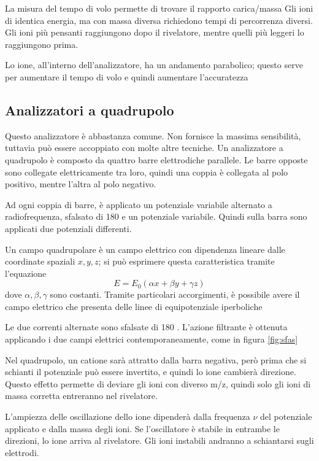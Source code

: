 La misura del tempo di volo permette di trovare il rapporto carica/massa
Gli ioni di identica energia, ma con massa diversa richiedono tempi di percorrenza diversi.
Gli ioni più pensanti raggiungono dopo il rivelatore, mentre quelli più leggeri lo raggiungono prima.

Lo ione, all'interno dell'analizzatore, ha un andamento parabolico; questo serve per aumentare il tempo di volo e quindi aumentare l'accuratezza

\subsection{Analizzatori a quadrupolo}
Questo analizzatore è abbastanza comune. Non fornisce la massima sensibilità, tuttavia può essere accoppiato con molte altre tecniche.
Un analizzatore a quadrupolo è composto da quattro barre elettrodiche parallele.
Le barre opposte sono collegate elettricamente tra loro, quindi una coppia è collegata al polo positivo, mentre l'altra al polo negativo.


Ad ogni coppia di barre, è applicato un potenziale variabile alternato a radiofrequenza, sfalsato di 180 \degree e un potenziale variabile.
Quindi sulla barra sono applicati due potenziali differenti.

Un campo quadrupolare è un campo elettrico con dipendenza lineare dalle coordinate spaziali $x,y,z$; si può esprimere questa caratteristica tramite l'equazione
\[
E = E_0 (\alpha x + \beta y + \gamma z)
\]
dove $\alpha, \beta, \gamma$ sono costanti. Tramite particolari accorgimenti, è possibile avere il campo elettrico che presenta delle linee di equipotenziale iperboliche

Le due correnti alternate sono sfalsate di 180 \degree. L'azione filtrante è ottenuta applicando i due campi elettrici contemporaneamente, come in figura \ref{fig:sfas}


Nel quadrupolo, un catione sarà attratto dalla barra negativa, però prima che si schianti il potenziale può essere invertito, e quindi lo ione cambierà direzione.
Questo effetto permette di deviare gli ioni con diverso m/z, quindi solo gli ioni di massa corretta entreranno nel rivelatore.

L'ampiezza delle oscillazione dello ione dipenderà dalla frequenza $\nu$ del potenziale applicato e dalla massa degli ioni.
Se l'oscillatore è stabile in entrambe le direzioni, lo ione arriva al rivelatore.
Gli ioni instabili andranno a schiantarsi sugli elettrodi.

